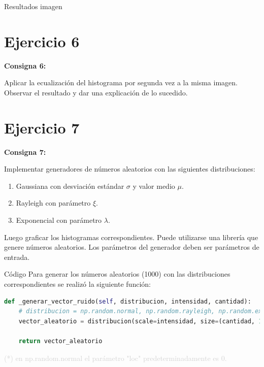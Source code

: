 \documentclass{beamer}
\begin{document}
\begin{frame}[fragile]{Resultados imagen}
\begin{minipage}{0.45\linewidth}
		\label{fig:lenaej5}
	\end{minipage}
\end{frame}

\section{Ejercicio 6}

\begin{frame}
	\begin{center}
		\textcolor{unahurverde}{\textbf{Consigna 6:}}
	\end{center}
	\justifying
	
	Aplicar la ecualización del histograma por segunda vez a la misma imagen.  
	Observar el resultado y dar una explicación de lo sucedido.
\end{frame}

\section{Ejercicio 7}

\begin{frame}
	\begin{center}
		\textcolor{unahurverde}{\textbf{Consigna 7:}}
	\end{center}
	\justifying
	
	Implementar generadores de números aleatorios con las siguientes distribuciones:
	
	\begin{enumerate}%
		\item Gaussiana con desviación estándar $\sigma$ y valor medio $\mu$.
		\item Rayleigh con parámetro $\xi$.
		\item Exponencial con parámetro $\lambda$.
	\end{enumerate}
	
	\vspace{0.3cm}
	
	Luego graficar los histogramas correspondientes.  
	Puede utilizarse una librería que genere números aleatorios.  
	Los parámetros del generador deben ser parámetros de entrada.
\end{frame}

\begin{frame}[fragile]{Código}
	\justifying
	Para generar los números aleatorios (1000) con las distribuciones correspondientes se realizó la siguiente función:
	
	\begin{lstlisting}[language=Python]
def _generar_vector_ruido(self, distribucion, intensidad, cantidad):
	# distribucion = np.random.normal, np.random.rayleigh, np.random.exponential
	vector_aleatorio = distribucion(scale=intensidad, size=(cantidad, 1))
	
	return vector_aleatorio
	\end{lstlisting}
	
	\vfill
	\footnotesize \textcolor{lightgray}{(*) en np.random.normal el parámetro "loc" predeterminadamente es 0.}
\end{frame}
\end{document}
